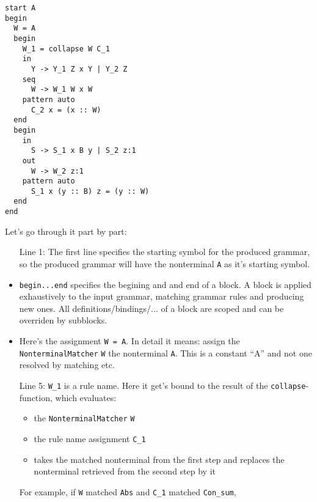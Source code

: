 \documentclass[a4paper]{article}
\begin{document}
\begin{lstlisting}[language=transformer]
start A
begin
  W = A
  begin
    W_1 = collapse W C_1 
    in
      Y -> Y_1 Z x Y | Y_2 Z
    seq
      W -> W_1 W x W
    pattern auto
      C_2 x = (x :: W)
  end
  begin
    in
      S -> S_1 x B y | S_2 z:1
    out
      W -> W_2 z:1
    pattern auto
      S_1 x (y :: B) z = (y :: W)
  end  
end
\end{lstlisting}
Let's go through it part by part:
\begin{itemize}
\item[Line 1:\hspace{0.5em}] 
The first line specifies the starting symbol for the produced grammar, so the produced grammar will have the nonterminal \lstinline[language=transformer]{A} as it's starting symbol.  
\item[{\parbox[t]{\widthof{Lines 2}+0.5em}{Lines 2\\and 21:\vspace{-5em}}}] 
\lstinline[language=transformer]{begin...end} specifies the begining and and end of a block. A block is applied exhaustively to the input grammar, matching grammar rules and producing new ones. All definitions/bindings/... of a block are scoped and can be overriden by subblocks.
\item[Line 3:\hspace{0.5em}] 
Here's the assignment \lstinline[language=transformer]{W = A}. In detail it means: assign the \lstinline[language=scala]{NonterminalMatcher} \lstinline[language=transformer]{W} the nonterminal \lstinline[language=transformer]{A}. This is a constant ``A'' and not one resolved by matching etc.
\item[Line 5:\hspace{0.5em}] 
\lstinline[language=transformer]{W_1} is a rule name. Here it get's bound to the result of the \lstinline[language=scala]{collapse}-function, which evaluates:
\begin{itemize}
\item 
the \lstinline[language=scala]{NonterminalMatcher} \lstinline[language=transformer]{W}
\item 
the rule name assignment \lstinline[language=transformer]{C_1}
\item 
takes the matched nonterminal from the first step and replaces the nonterminal retrieved from the second step by it
\end{itemize}
For example, if \lstinline[language=transformer]{W} matched \lstinline[language=grammar]{Abs} and \lstinline[language=transformer]{C_1} matched \lstinline[language=grammar]{Con_sum}, 

\end{itemize}
\end{document}
